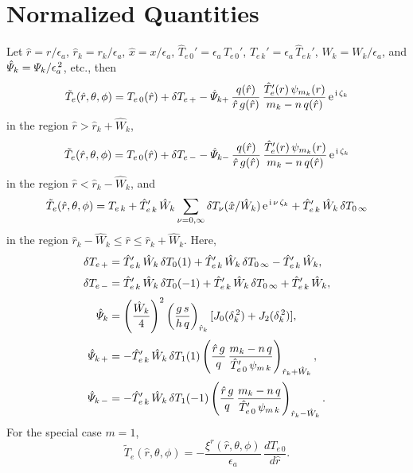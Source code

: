 \documentclass[12pt,prb,aps,notitlepage]{revtex4-1}
\begin{document}
\section{Normalized Quantities}
Let $\hat{r}=r/\epsilon_a$, $\hat{r}_k=r_k/\epsilon_a$, $\hat{x}= x/\epsilon_a$, $\hat{T}_{e\,0}' = \epsilon_a\,T_{e\,0}'$, $\hat{T}_{e\,k}'=\epsilon_a\,\hat{T}_{e\,k}'$, 
$\hat{W}_k = W_k/\epsilon_a$, and $\hat{\mit\Psi}_k={\mit\Psi}_k/\epsilon_a^{\,2}$, etc., 
then
\begin{equation}
\tilde{T}_e(\hat{r},\theta,\phi) = T_{e\,0}(\hat{r}) + \delta T_{e\,+} - \hat{\mit\Psi}_{k+}\,\frac{q(\hat{r})}{\hat{r}\,g(\hat{r})}\,\frac{\hat{T}_e'(r)\,\psi_{m_k}(r)}{m_k-n\,q(\hat{r})}\,{\rm e}^{\,{\rm i}\,\zeta_k}
\end{equation}
in the region $\hat{r}>\hat{r}_k+\hat{W}_k$, 
\begin{equation}
\tilde{T}_e(\hat{r},\theta,\phi) = T_{e\,0}(\hat{r}) + \delta T_{e\,-} - \hat{{\mit\Psi}}_{k-}\,\frac{q(\hat{r})}{\hat{r}\,g(\hat{r})}\,\frac{\hat{T}_e'(r)\,\psi_{m_k}(r)}{m_k-n\,q(\hat{r})}\,{\rm e}^{\,{\rm i}\,\zeta_k}
\end{equation}
in the region $\hat{r}< \hat{r}_k-\hat{W}_k$, and 
\begin{equation}
\tilde{T}_e(\hat{r}, \theta,\phi)=T_{e\,k} +\hat{T}_{e\,k}'\,\hat{W}_k\sum_{\nu=0,\infty}\delta T_\nu(\hat{x}/\hat{W}_k)\,{\rm e}^{\,{\rm i}\,\nu\,\zeta_k}+\hat{T}_{e\,k}'\,\hat{W}_k\,\delta T_{0\,\infty}
\end{equation}
in the region $\hat{r}_k-\hat{W}_k \leq \hat{r}\leq \hat{r}_k+\hat{W}_k$. Here, 
\begin{align}
\delta T_{e\,+} &= \hat{T}_{e\,k}'\,\hat{W}_k\,\delta T_0(1)+\hat{T}_{e\,k}'\,\hat{W}_k\,\delta T_{0\,\infty} - \hat{T}_{e\,k}'\,\hat{W}_k,\\[0.5ex]
\delta T_{e\,-} &=\hat{T}_{e\,k}'\,\hat{W}_k\,\delta T_0(-1) +\hat{T}_{e\,k}'\,\hat{W}_k\,\delta T_{0\,\infty} +\hat{T}_{e\,k}'\,\hat{W}_k,\\[0.5ex]
\hat{\mit\Psi}_k&=\left(\frac{\hat{W}_k}{4}\right)^2\left(\frac{g\,s}{h\,q}\right)_{\hat{r}_k}[J_0(\delta_k^{\,2})+J_2(\delta_k^{\,2})],\\[0.5ex]
\hat{\mit\Psi}_{k\,+} &= - \hat{T}_{e\,k}'\,\hat{W}_k\,\delta T_1(1)\left(\frac{\hat{r}\,g}{q}\,\frac{m_k-n\,q}{\hat{T}_{e\,0}'\,\psi_{m\,k}}\right)_{\hat{r}_k+\hat{W}_k},\\[0.5ex]
\hat{\mit\Psi}_{k\,-} &= -\hat{T}_{e\,k}'\,\hat{W}_k\,\delta T_1(-1)\left(\frac{\hat{r}\,g}{q}\,\frac{m_k-n\,q}{\hat{T}_{e\,0}'\,\psi_{m\,k}}\right)_{\hat{r}_k-\hat{W}_k}.
\end{align}
For the special case $m=1$, 
\begin{equation}
\tilde{T}_e(\hat{r},\theta,\phi) = - \frac{\xi^r(\hat{r},\theta,\phi)}{\epsilon_a}\,\frac{ dT_{e\,0}}{d\hat{r}}.
\end{equation}
\end{document}
